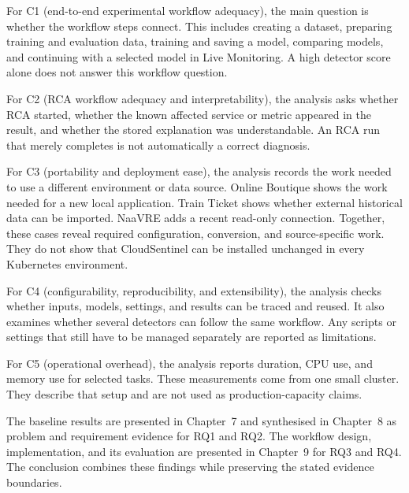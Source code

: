 For C1 (end-to-end experimental workflow adequacy), the main question is whether the workflow steps connect. This includes creating a dataset, preparing training and evaluation data, training and saving a model, comparing models, and continuing with a selected model in Live Monitoring. A high detector score alone does not answer this workflow question.

For C2 (RCA workflow adequacy and interpretability), the analysis asks whether RCA started, whether the known affected service or metric appeared in the result, and whether the stored explanation was understandable. An RCA run that merely completes is not automatically a correct diagnosis.

For C3 (portability and deployment ease), the analysis records the work needed to use a different environment or data source. Online Boutique shows the work needed for a new local application. Train Ticket shows whether external historical data can be imported. NaaVRE adds a recent read-only connection. Together, these cases reveal required configuration, conversion, and source-specific work. They do not show that CloudSentinel can be installed unchanged in every Kubernetes environment.

For C4 (configurability, reproducibility, and extensibility), the analysis checks whether inputs, models, settings, and results can be traced and reused. It also examines whether several detectors can follow the same workflow. Any scripts or settings that still have to be managed separately are reported as limitations.

For C5 (operational overhead), the analysis reports duration, CPU use, and memory use for selected tasks. These measurements come from one small cluster. They describe that setup and are not used as production-capacity claims.

The baseline results are presented in Chapter~7 and synthesised in Chapter~8 as problem and requirement evidence for RQ1 and RQ2. The workflow design, implementation, and its evaluation are presented in Chapter~9 for RQ3 and RQ4. The conclusion combines these findings while preserving the stated evidence boundaries.


